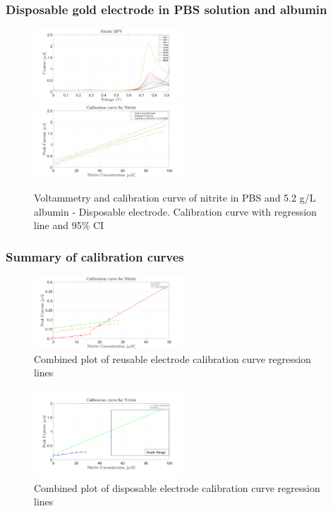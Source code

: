 \subsubsection*{Disposable gold electrode in PBS solution and albumin}
\begin{figure}[H]
    \centering
    \includegraphics[width = 0.5\textwidth]{img/disp albumin.png} \includegraphics[width = 0.5\textwidth]{img/disp albumin calibration.png}
    \caption{Voltammetry and calibration curve of nitrite in PBS and 5.2 g/L albumin - Disposable electrode. Calibration curve with regression line and 95\% CI}
    \label{fig:nitrite_result_4}
\end{figure}

\subsubsection*{Summary of calibration curves}
\begin{figure}[H]
    \centering
    \includegraphics[width = 0.5\textwidth]{img/combinedreus new.png}
    \caption{Combined plot of reusable electrode calibration curve regression lines}
    \label{fig:nitrite_calibration_1}
\end{figure}

\begin{figure}[H]
    \centering
    \includegraphics[width = 0.5\textwidth]{img/reusable_nitrite_James.png}
    \caption{Combined plot of disposable electrode calibration curve regression lines}
    \label{fig:nitrite_calibration_2}
\end{figure}

